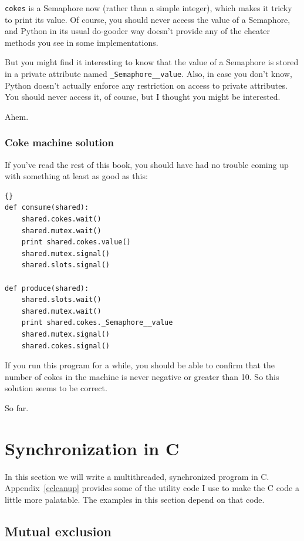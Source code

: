 \documentclass{book}
\newcommand{\clearemptydoublepage}{\newpage\cleardoublepage}
\begin{document}
{\tt cokes} is a Semaphore now (rather than a simple integer), 
which makes it tricky to print its value.  Of course, you
should never access the value of a Semaphore, and Python in
its usual do-gooder way doesn't provide any of the cheater
methods you see in some implementations.

But you might find it interesting to know that the value
of a Semaphore is stored in a private attribute named
{\tt \_Semaphore\_\_value}.  Also, in case you don't know,
Python doesn't actually enforce any restriction on access to
private attributes.  You should never access it, of course,
but I thought you might be interested.

Ahem.


\clearemptydoublepage
\subsection {Coke machine solution}

If you've read the rest of this book, you should have had no
trouble coming up with something at least as good as this:

\begin{latin}
\begin{lstlisting}[title={}]{}
def consume(shared):
    shared.cokes.wait()
    shared.mutex.wait()
    print shared.cokes.value()
    shared.mutex.signal()
    shared.slots.signal()

def produce(shared):
    shared.slots.wait()
    shared.mutex.wait()
    print shared.cokes._Semaphore__value
    shared.mutex.signal()
    shared.cokes.signal()
\end{lstlisting}
\end{latin}

If you run this program for a while, you should be able to confirm
that the number of cokes in the machine is never negative or greater
than 10.  So this solution seems to be correct.

So far.


\chapter{Synchronization in C}
\label{csync}

In this section we will write a multithreaded, synchronized
program in C.  Appendix~\ref{ccleanup} provides some of the utility
code I use to make the C code a little more palatable.  The
examples in this section depend on that code.

\section{Mutual exclusion}
\end{document}

